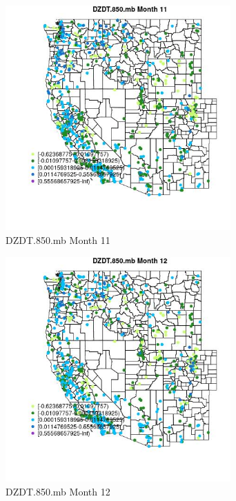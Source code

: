\begin{figure} 
\centering  
\includegraphics[width=0.77\textwidth]{Code_Outputs/Report_ML_input_PM25_Step4_part_f_de_duplicated_aveswNAs_MapObsMo11DZDT850mb.jpg} 
\caption{\label{fig:Report_ML_input_PM25_Step4_part_f_de_duplicated_aveswNAsMapObsMo11DZDT850mb}DZDT.850.mb Month 11} 
\end{figure} 
 

\begin{figure} 
\centering  
\includegraphics[width=0.77\textwidth]{Code_Outputs/Report_ML_input_PM25_Step4_part_f_de_duplicated_aveswNAs_MapObsMo12DZDT850mb.jpg} 
\caption{\label{fig:Report_ML_input_PM25_Step4_part_f_de_duplicated_aveswNAsMapObsMo12DZDT850mb}DZDT.850.mb Month 12} 
\end{figure} 
 


